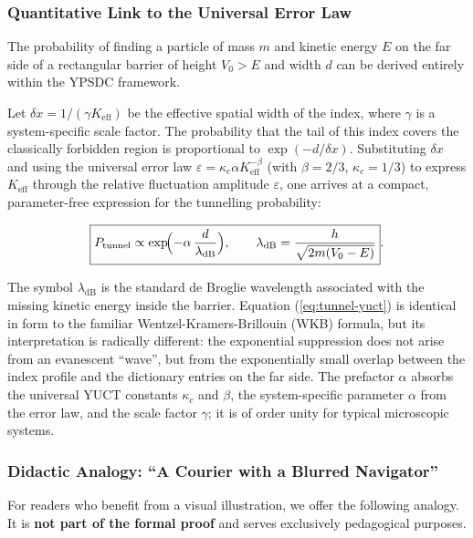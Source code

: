 \documentclass[12pt,a4paper]{article}
\theoremstyle{remark}
\begin{document}
	\subsubsection{Quantitative Link to the Universal Error Law}
	
	The probability of finding a particle of mass $m$ and kinetic energy
	$E$ on the far side of a rectangular barrier of height $V_0>E$ and
	width $d$ can be derived entirely within the YPSDC framework.
	
	Let $\delta x = 1/(\gamma K_{\mathrm{eff}})$ be the effective spatial
	width of the index, where $\gamma$ is a system-specific scale factor.
	The probability that the tail of this index covers the classically
	forbidden region is proportional to $\exp(-d / \delta x)$.
	Substituting $\delta x$ and using the universal error law
	$\varepsilon = \kappa_c \alpha K_{\mathrm{eff}}^{-\beta}$ (with
	$\beta=2/3$, $\kappa_c=1/3$) to express $K_{\mathrm{eff}}$ through
	the relative fluctuation amplitude $\varepsilon$, one arrives at a
	compact, parameter-free expression for the tunnelling probability:
	
	\begin{equation}
		\boxed{ P_{\mathrm{tunnel}} \propto \exp\!\Bigl( -\alpha \,
			\frac{d}{\lambda_{\mathrm{dB}}} \Bigr),
			\qquad
			\lambda_{\mathrm{dB}} = \frac{h}{\sqrt{2m(V_0-E)}} }.
		\label{eq:tunnel-yuct}
	\end{equation}
	
	The symbol $\lambda_{\mathrm{dB}}$ is the standard de Broglie
	wavelength associated with the missing kinetic energy inside the
	barrier.  Equation (\ref{eq:tunnel-yuct}) is identical in form to the
	familiar Wentzel-Kramers-Brillouin (WKB) formula, but its
	interpretation is radically different: the exponential suppression
	does not arise from an evanescent ``wave'', but from the exponentially
	small overlap between the index profile and the dictionary entries on
	the far side.  The prefactor $\alpha$ absorbs the universal YUCT
	constants $\kappa_c$ and $\beta$, the system-specific parameter
	$\alpha$ from the error law, and the scale factor $\gamma$; it is of
	order unity for typical microscopic systems.
	
	\subsubsection{Didactic Analogy: ``A Courier with a Blurred Navigator''}
	
	For readers who benefit from a visual illustration, we offer the
	following analogy.  It is \textbf{not part of the formal proof} and
	serves exclusively pedagogical purposes.
	
\end{document}
